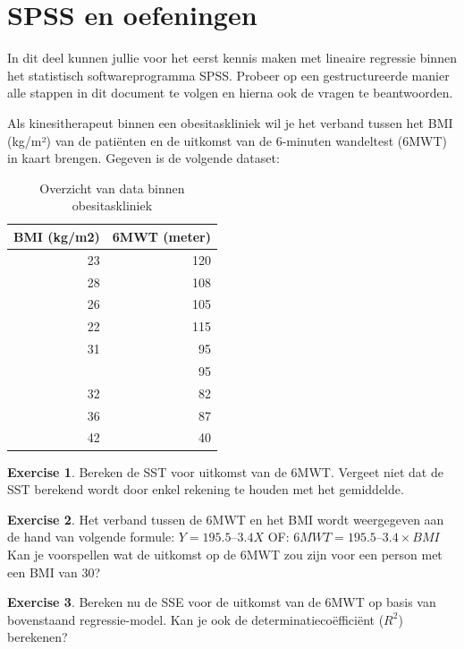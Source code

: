 \documentclass[
]{book}
\theoremstyle{definition}
\theoremstyle{definition}
\theoremstyle{definition}
\newtheorem{exercise}{Exercise}[chapter]
\theoremstyle{definition}
\theoremstyle{remark}
\begin{document}
\hypertarget{spss-en-oefeningen}{%
\section*{SPSS en oefeningen}\label{spss-en-oefeningen}}


In dit deel kunnen jullie voor het eerst kennis maken met lineaire regressie binnen het statistisch softwareprogramma SPSS. Probeer op een gestructureerde manier alle stappen in dit document te volgen en hierna ook de vragen te beantwoorden.

Als kinesitherapeut binnen een obesitaskliniek wil je het verband tussen het BMI (kg/m²) van de patiënten en de uitkomst van de 6-minuten wandeltest (6MWT) in kaart brengen. Gegeven is de volgende dataset:

\begin{table}

\caption{\label{tab:unnamed-chunk-14}Overzicht van data binnen obesitaskliniek}
\centering
\begin{tabular}[t]{rr}
\toprule
BMI (kg/m2) & 6MWT (meter)\\
\midrule
23 & 120\\
28 & 108\\
26 & 105\\
22 & 115\\
31 & 95\\
\addlinespace
26 & 95\\
32 & 82\\
36 & 87\\
42 & 40\\
\bottomrule
\end{tabular}
\end{table}

\begin{exercise}
Bereken de SST voor uitkomst van de 6MWT. Vergeet niet dat de SST berekend wordt door enkel rekening te houden met het gemiddelde.
\end{exercise}

\begin{exercise}
Het verband tussen de 6MWT en het BMI wordt weergegeven aan de hand van volgende formule: \(Y = 195.5 – 3.4X\) OF: \(6MWT = 195.5 – 3.4 \times BMI\) Kan je voorspellen wat de uitkomst op de 6MWT zou zijn voor een person met een BMI van 30?
\end{exercise}

\begin{exercise}
Bereken nu de SSE voor de uitkomst van de 6MWT op basis van bovenstaand regressie-model. Kan je ook de determinatiecoëfficiënt (\(R^2\)) berekenen?
\end{exercise}
\end{document}
